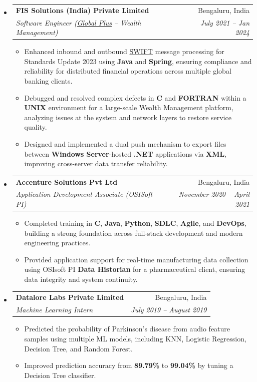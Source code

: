 \documentclass[letterpaper,10pt]{article}
\makeatletter
\newcommand{\resitem}[1]{\item #1 \vspace{-1pt}}
\newcommand{\ressubheading}[4]{
\begin{tabular*}{\linewidth}{l@{\extracolsep{\fill}}r}
        \textbf{#1} & #2 \\
        \textit{#3} & \textit{#4} \\
\end{tabular*}\vspace{-6pt}}
\makeatother
\begin{document}
\begin{itemize}[leftmargin=0pt, itemsep=0pt, parsep=0pt]
\item[]
    \ressubheading{FIS Solutions (India) Private Limited}{Bengaluru, India}{Software Engineer (\href{https://www.fisglobal.com/-/media/fisglobal/files/pdf/product-sheet/global-plus-product-sheet.pdf}{Global Plus} -- Wealth Management)}{July 2021 -- Jan 2024}
    \begin{itemize}[itemsep=1pt, parsep=0pt]
        \resitem{Enhanced inbound and outbound \href{https://www.swift.com/}{SWIFT} message processing for Standards Update 2023 using \textbf{Java} and \textbf{Spring}, ensuring compliance and reliability for distributed financial operations across multiple global banking clients.}
        \resitem{Debugged and resolved complex defects in \textbf{C} and \textbf{FORTRAN} within a \textbf{UNIX} environment for a large-scale Wealth Management platform, analyzing issues at the system and network layers to restore service quality.}
        \resitem{Designed and implemented a dual push mechanism to export files between \textbf{Windows Server}-hosted \textbf{.NET} applications via \textbf{XML}, improving cross-server data transfer reliability.}
    \end{itemize}

\item[]
    \ressubheading{Accenture Solutions Pvt Ltd}{Bengaluru, India}{Application Development Associate (OSISoft PI)}{November 2020 -- April 2021}
    \begin{itemize}[itemsep=1pt, parsep=0pt]
        \resitem{Completed training in \textbf{C}, \textbf{Java}, \textbf{Python}, \textbf{SDLC}, \textbf{Agile}, and \textbf{DevOps}, building a strong foundation across full-stack development and modern engineering practices.}
        \resitem{Provided application support for real-time manufacturing data collection using OSIsoft PI \textbf{Data Historian} for a pharmaceutical client, ensuring data integrity and system continuity.}
    \end{itemize}

\item[]
    \ressubheading{Datalore Labs Private Limited}{Bengaluru, India}{Machine Learning Intern}{July 2019 -- August 2019}
    \begin{itemize}[itemsep=1pt, parsep=0pt]
        \resitem{Predicted the probability of Parkinson's disease from audio feature samples using multiple ML models, including KNN, Logistic Regression, Decision Tree, and Random Forest.}
        \resitem{Improved prediction accuracy from \textbf{89.79\%} to \textbf{99.04\%} by tuning a Decision Tree classifier.}
    \end{itemize}
\end{itemize}
\end{document}
